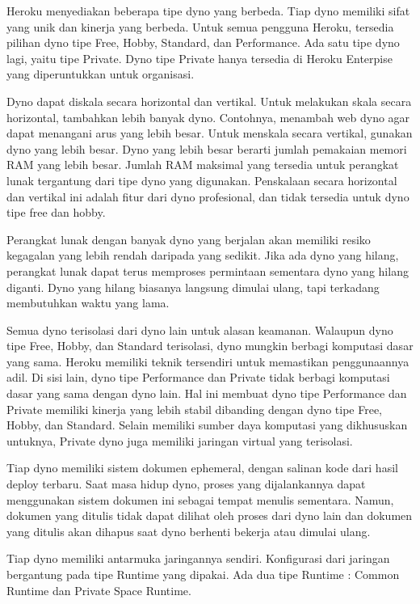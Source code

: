 Heroku menyediakan beberapa tipe dyno yang berbeda. Tiap dyno memiliki sifat yang unik dan kinerja yang berbeda. Untuk semua pengguna Heroku, tersedia pilihan dyno tipe Free, Hobby, Standard, dan Performance. Ada satu tipe dyno lagi, yaitu tipe Private. Dyno tipe Private hanya tersedia di Heroku Enterpise yang diperuntukkan untuk organisasi.

Dyno dapat diskala secara horizontal dan vertikal. Untuk melakukan skala secara horizontal, tambahkan lebih banyak dyno. Contohnya, menambah web dyno agar dapat menangani arus yang lebih besar. Untuk menskala secara vertikal, gunakan dyno yang lebih besar. Dyno yang lebih besar berarti jumlah pemakaian memori RAM yang lebih besar. Jumlah RAM maksimal yang tersedia untuk perangkat lunak tergantung dari tipe dyno yang digunakan. Penskalaan secara horizontal dan vertikal ini adalah fitur dari dyno profesional, dan tidak tersedia untuk dyno tipe free dan hobby.

Perangkat lunak dengan banyak dyno yang berjalan akan memiliki resiko kegagalan yang lebih rendah daripada yang sedikit. Jika ada dyno yang hilang, perangkat lunak dapat terus memproses permintaan sementara dyno yang hilang diganti. Dyno yang hilang biasanya langsung dimulai ulang, tapi terkadang membutuhkan waktu yang lama.

Semua dyno terisolasi dari dyno lain untuk alasan keamanan. Walaupun dyno tipe Free, Hobby, dan Standard terisolasi, dyno mungkin berbagi komputasi dasar yang sama. Heroku memiliki teknik tersendiri untuk memastikan penggunaannya adil. Di sisi lain, dyno tipe Performance dan Private tidak berbagi komputasi dasar yang sama dengan dyno lain. Hal ini membuat dyno tipe Performance dan Private memiliki kinerja yang lebih stabil dibanding dengan dyno tipe Free, Hobby, dan Standard. Selain memiliki sumber daya komputasi yang dikhususkan untuknya, Private dyno juga memiliki jaringan virtual yang terisolasi.

Tiap dyno memiliki sistem dokumen ephemeral, dengan salinan kode dari hasil deploy terbaru. Saat masa hidup dyno, proses yang dijalankannya dapat menggunakan sistem dokumen ini sebagai tempat menulis sementara. Namun, dokumen yang ditulis tidak dapat dilihat oleh proses dari dyno lain dan dokumen yang ditulis akan dihapus saat dyno berhenti bekerja atau dimulai ulang.

Tiap dyno memiliki antarmuka jaringannya sendiri. Konfigurasi dari jaringan bergantung pada tipe Runtime yang dipakai. Ada dua tipe Runtime : Common Runtime dan Private Space Runtime. 

